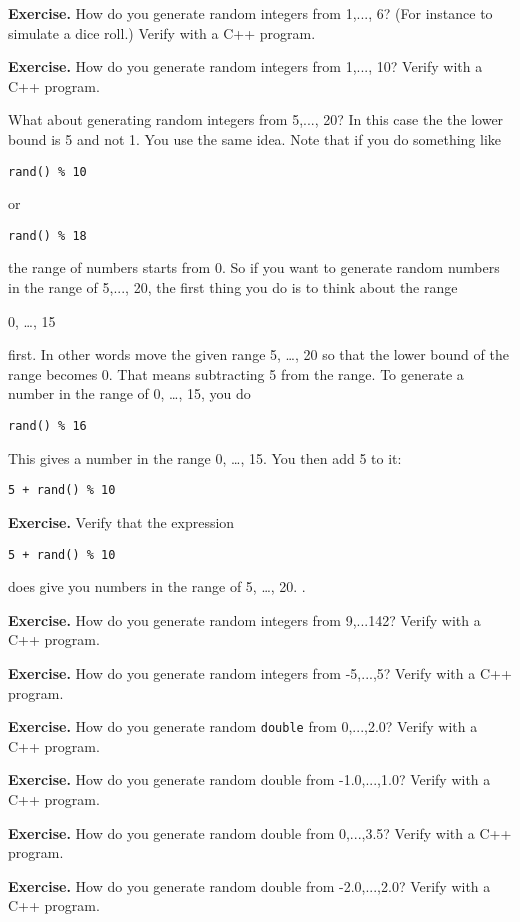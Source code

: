 \textbf{Exercise.} How do you generate random integers from 1,..., 6?
(For instance to simulate a dice roll.) Verify with a C++ program.

\textbf{Exercise.} How do you generate random integers from 1,..., 10?
Verify with a C++ program.

What about generating random integers from 5,..., 20? In this case the
the lower bound is 5 and not 1. You use the same idea. Note that if you
do something like
\begin{center}
\texttt{rand() \% 10}
\end{center}
or
\begin{center}
\texttt{rand() \% 18}
\end{center}
the range of numbers starts from 0. So if you want to generate random
numbers in the range of 5,..., 20, the first thing you do is to think
about the range
\begin{center}
0, \dots, 15
\end{center}
first. In other words move the given range 5, \ldots, 20 so that the
lower bound of the range becomes 0. That means subtracting 5 from the
range. To generate a number in the range of 0, \ldots, 15, you do
\begin{center}
\texttt{rand() \% 16}
\end{center}
This gives a number in the range 0, \ldots, 15. You then add 5 to it:
\begin{center}
\texttt{5 + rand() \% 10}
\end{center}
\textbf{Exercise.} Verify that the expression\\
\begin{center}
\texttt{5 + rand() \% 10}
\end{center}
does give you numbers in the range of 5, \dots, 20. .

\textbf{Exercise.} How do you generate random integers from 9,...142?
Verify with a C++ program.

\textbf{Exercise.} How do you generate random integers from -5,...,5?
Verify with a C++ program.

\textbf{Exercise.} How do you generate random \verb`double` from
0,...,2.0? Verify with a C++ program.

\textbf{Exercise.} How do you generate random double from -1.0,...,1.0?
Verify with a C++ program.

\textbf{Exercise.} How do you generate random double from 0,...,3.5?
Verify with a C++ program.

\textbf{Exercise.} How do you generate random double from -2.0,...,2.0?
Verify with a C++ program.

